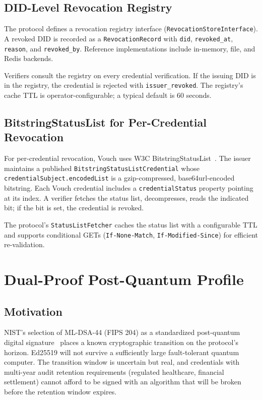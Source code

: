 \documentclass[11pt,a4paper,twocolumn]{article}
\begin{document}
\subsection{DID-Level Revocation Registry}

The protocol defines a revocation registry interface (\verb|RevocationStoreInterface|). A revoked DID is recorded as a \verb|RevocationRecord| with \verb|did|, \verb|revoked_at|, \verb|reason|, and \verb|revoked_by|. Reference implementations include in-memory, file, and Redis backends.

Verifiers consult the registry on every credential verification. If the issuing DID is in the registry, the credential is rejected with \verb|issuer_revoked|. The registry's cache TTL is operator-configurable; a typical default is 60 seconds.

\subsection{BitstringStatusList for Per-Credential Revocation}

For per-credential revocation, Vouch uses W3C BitstringStatusList~\cite{w3cbsl}. The issuer maintains a published \texttt{BitstringStatusListCredential} whose \verb|credentialSubject.encodedList| is a gzip-compressed, base64url-encoded bitstring. Each Vouch credential includes a \verb|credentialStatus| property pointing at its index. A verifier fetches the status list, decompresses, reads the indicated bit; if the bit is set, the credential is revoked.

The protocol's \verb|StatusListFetcher| caches the status list with a configurable TTL and supports conditional GETs (\verb|If-None-Match|, \verb|If-Modified-Since|) for efficient re-validation.

\section{Dual-Proof Post-Quantum Profile}
\label{sec:hybrid}

\subsection{Motivation}

NIST's selection of ML-DSA-44 (FIPS 204) as a standardized post-quantum digital signature~\cite{nistfips204} places a known cryptographic transition on the protocol's horizon. Ed25519 will not survive a sufficiently large fault-tolerant quantum computer. The transition window is uncertain but real, and credentials with multi-year audit retention requirements (regulated healthcare, financial settlement) cannot afford to be signed with an algorithm that will be broken before the retention window expires.
\end{document}
